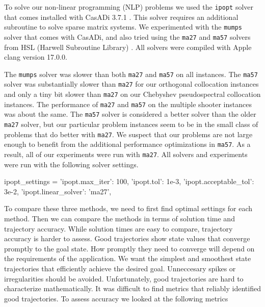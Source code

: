 \documentclass[]{article}
\begin{document}
	To solve our non-linear programming (NLP) problems we used the \texttt{ipopt} solver \citep{ipopt} that comes installed with CasADi 3.7.1 \citep{casadi}.   This solver requires an additional subroutine to  solve sparse matrix systems. We experimented with the \texttt{mumps}  solver that comes with CasADi, and also tried using the  \texttt{ma27} and  \texttt{ma57} solvers  from HSL (Harwell Subroutine Library) \citep{hsl}. All solvers were compiled with Apple clang version 17.0.0.   

	The \texttt{mumps} solver was slower than both \texttt{ma27}  and  \texttt{ma57}  on all instances.  The \texttt{ma57} solver was substantially slower than \texttt{ma27} for our orthogonal collocation instances and only a tiny bit slower than \texttt{ma27} on our Chebyshev pseudospectral collocation instances. The performance of \texttt{ma27}  and  \texttt{ma57}  on  the multiple shooter instances was about the same.  The \texttt{ma57} solver is considered a better solver than the older  \texttt{ma27} solver, but our particular problem instances seem to be in the small class of problems that do better with  \texttt{ma27}. We suspect that our problems are not large enough to benefit from the additional performance optimizations in  \texttt{ma57}.  As a result, all of our experiments were run with  \texttt{ma27}. All solvers and experiments were run with the following solver settings.
	\vspace{\baselineskip}
	\begin{python}
	ipopt_settings = {
		'ipopt.max_iter': 100,                  
		'ipopt.tol': 1e-3,                      	
		'ipopt.acceptable_tol': 3e-2,
		'ipopt.linear_solver': 'ma27',
	}
	\end{python}
	\vspace{\baselineskip}

	To compare these three methods, we need to first find optimal settings for each method. Then we can compare the methods in terms of solution  time and trajectory accuracy. While solution times are easy to compare, trajectory accuracy is harder to assess.  Good trajectories show state values that converge promptly to the goal state. How promptly they need to converge will depend on the requirements of the application.  We want the simplest and smoothest state trajectories that efficiently achieve the desired goal. Unneccesary spikes or irregularities should be avoided. Unfortunately, good trajectories are hard to characterize mathematically. It was difficult to find metrics that reliably  identified good trajectories. To assess accuracy we looked at the following metrics
	
\end{document}
